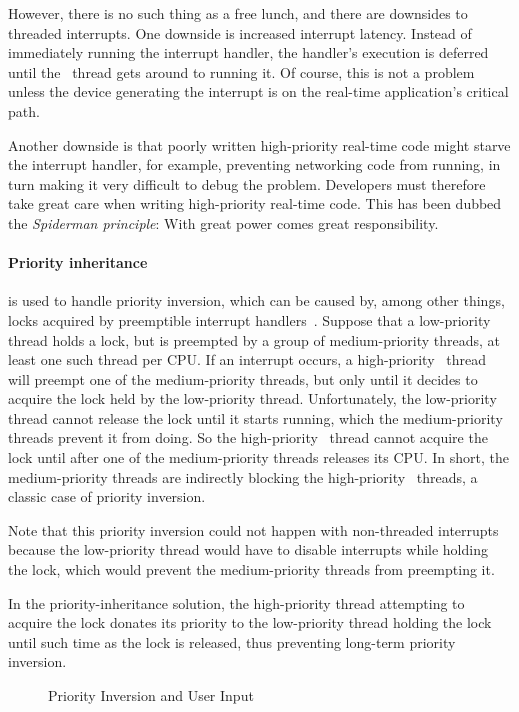 However, there is no such thing as a free lunch, and there are downsides
to threaded interrupts.
One downside is increased interrupt latency.
Instead of immediately running the interrupt handler, the handler's execution
is deferred until the \IRQ\ thread gets around to running it.
Of course, this is not a problem unless the device generating the interrupt
is on the real-time application's critical path.

Another downside is that poorly written high-priority real-time code
might starve the interrupt handler, for example, preventing networking
code from running, in turn making it very difficult to debug the problem.
Developers must therefore take great care when writing high-priority
real-time code.
This has been dubbed the \emph{Spiderman principle}: With great power
comes great responsibility.

\paragraph{Priority inheritance} is used to handle priority inversion,
which can be caused by, among other things, locks acquired by
preemptible interrupt handlers~\cite{LuiSha1990PriorityInheritance}.
Suppose that a low-priority thread holds a lock, but is preempted by
a group of medium-priority threads, at least one such thread per CPU\@.
If an interrupt occurs, a high-priority \IRQ\ thread will preempt one
of the medium-priority threads, but only until it decides to acquire
the lock held by the low-priority thread.
Unfortunately, the low-priority thread cannot release the lock until
it starts running, which the medium-priority threads prevent it from
doing.
So the high-priority \IRQ\ thread cannot acquire the lock until after one
of the medium-priority threads releases its CPU\@.
In short, the medium-priority threads are indirectly blocking the
high-priority \IRQ\ threads, a classic case of priority inversion.

Note that this priority inversion could not happen with non-threaded
interrupts because the low-priority thread would have to disable interrupts
while holding the lock, which would prevent the medium-priority
threads from preempting it.

In the priority-inheritance solution, the high-priority thread attempting
to acquire the lock donates its priority to the low-priority thread holding
the lock until such time as the lock is released, thus preventing long-term
priority inversion.

\begin{figure}[tb]
\centering
{}
\caption{Priority Inversion and User Input}
\end{figure}

